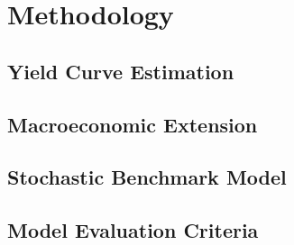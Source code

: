 \chapter{Methodology}

\section{Yield Curve Estimation}

\section{Macroeconomic Extension}

\section{Stochastic Benchmark Model}

\section{Model Evaluation Criteria}
